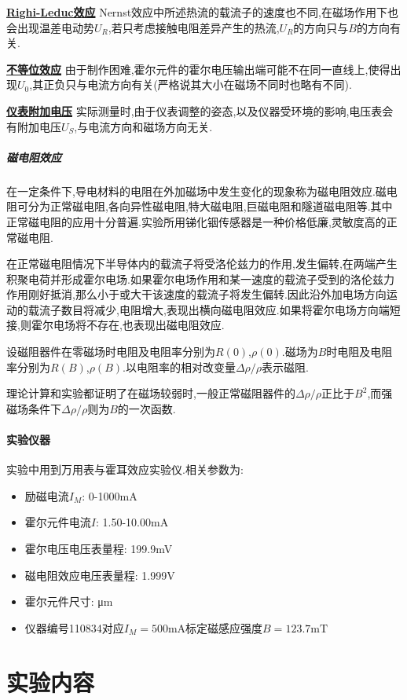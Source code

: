 \documentclass[UTF8,a4paper]{article}%
\begin{document}
\underline{\textbf{Righi-Leduc效应}}
Nernst效应中所述热流的载流子的速度也不同,在磁场作用下也会出现温差电动势$U_R$,若只考虑接触电阻差异产生的热流,$U_R$的方向只与$B$的方向有关.

\underline{\textbf{不等位效应}}
由于制作困难,霍尔元件的霍尔电压输出端可能不在同一直线上,使得出现$U_0$,其正负只与电流方向有关(严格说其大小在磁场不同时也略有不同).

\underline{\textbf{仪表附加电压}}
实际测量时,由于仪表调整的姿态,以及仪器受环境的影响,电压表会有附加电压$U_S$,与电流方向和磁场方向无关.
\subparagraph{磁电阻效应}
在一定条件下,导电材料的电阻在外加磁场中发生变化的现象称为磁电阻效应.磁电阻可分为正常磁电阻,各向异性磁电阻,特大磁电阻,巨磁电阻和隧道磁电阻等.其中正常磁电阻的应用十分普遍.实验所用锑化铟传感器是一种价格低廉,灵敏度高的正常磁电阻.

在正常磁电阻情况下半导体内的载流子将受洛伦兹力的作用,发生偏转,在两端产生积聚电荷并形成霍尔电场.如果霍尔电场作用和某一速度的载流子受到的洛伦兹力作用刚好抵消,那么小于或大干该速度的载流子将发生偏转.因此沿外加电场方向运动的载流子数目将减少,电阻增大,表现出横向磁电阻效应.如果将霍尔电场方向端短接,则霍尔电场将不存在,也表现出磁电阻效应.

设磁阻器件在零磁场时电阻及电阻率分别为$R(0)$,$\rho(0)$.磁场为$B$时电阻及电阻率分别为$R(B)$,$\rho(B)$.以电阻率的相对改变量$\Delta\rho/\rho$表示磁阻.

理论计算和实验都证明了在磁场较弱时,一般正常磁阻器件的$\Delta\rho/\rho$正比于$B^2$,而强磁场条件下$\Delta\rho/\rho$则为$B$的一次函数.
\paragraph{实验仪器}
实验中用到万用表与霍耳效应实验仪.相关参数为:
\begin{itemize}
    \item 励磁电流$I_M$: 0-1000\unit{\mA}
    \item 霍尔元件电流$I$: 1.50-10.00\unit{\mA}
    \item 霍尔电压电压表量程: 199.9\unit{\mV}
    \item 磁电阻效应电压表量程: 1.999\unit{\V}
    \item 霍尔元件尺寸: \unit{\micro\metre}
    \item 仪器编号110834对应$I_M=500\unit{\mA}$标定磁感应强度$B=123.7\unit{\milli\tesla}$
\end{itemize}
\section{实验内容}
\end{document}
